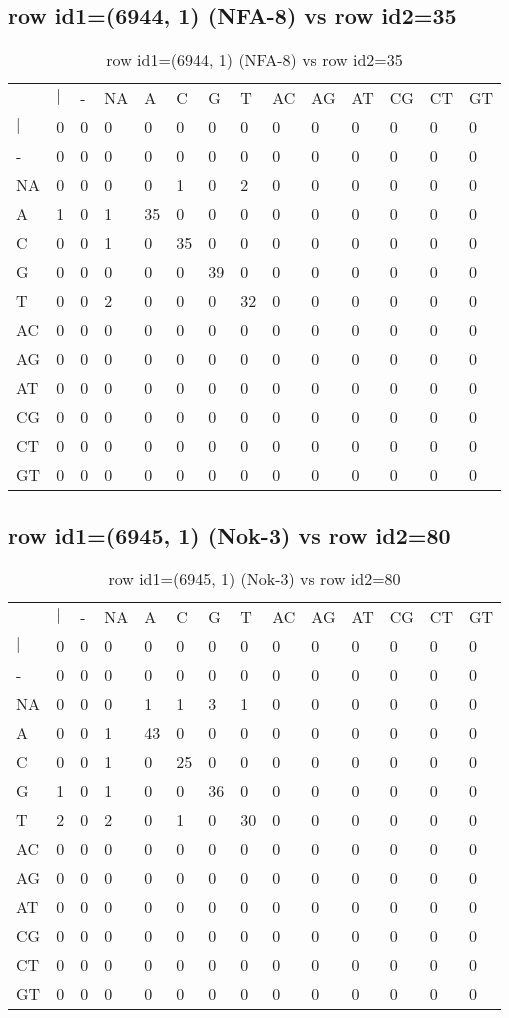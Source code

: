 \subsection{row id1=(6944, 1) (NFA-8) vs row id2=35}
\begin{center}
\begin{longtable}{|l|l|l|l|l|l|l|l|l|l|l|l|l|l|}
\caption{row id1=(6944, 1) (NFA-8) vs row id2=35} \label{table_dm154}\\
\hline
\\
\hline
&$|$&-&NA&A&C&G&T&AC&AG&AT&CG&CT&GT\\
$|$&0&0&0&0&0&0&0&0&0&0&0&0&0\\
-&0&0&0&0&0&0&0&0&0&0&0&0&0\\
NA&0&0&0&0&1&0&2&0&0&0&0&0&0\\
A&1&0&1&35&0&0&0&0&0&0&0&0&0\\
C&0&0&1&0&35&0&0&0&0&0&0&0&0\\
G&0&0&0&0&0&39&0&0&0&0&0&0&0\\
T&0&0&2&0&0&0&32&0&0&0&0&0&0\\
AC&0&0&0&0&0&0&0&0&0&0&0&0&0\\
AG&0&0&0&0&0&0&0&0&0&0&0&0&0\\
AT&0&0&0&0&0&0&0&0&0&0&0&0&0\\
CG&0&0&0&0&0&0&0&0&0&0&0&0&0\\
CT&0&0&0&0&0&0&0&0&0&0&0&0&0\\
GT&0&0&0&0&0&0&0&0&0&0&0&0&0\\
\hline
\end{longtable}
\end{center}

\subsection{row id1=(6945, 1) (Nok-3) vs row id2=80}
\begin{center}
\begin{longtable}{|l|l|l|l|l|l|l|l|l|l|l|l|l|l|}
\caption{row id1=(6945, 1) (Nok-3) vs row id2=80} \label{table_dm156}\\
\hline
\\
\hline
&$|$&-&NA&A&C&G&T&AC&AG&AT&CG&CT&GT\\
$|$&0&0&0&0&0&0&0&0&0&0&0&0&0\\
-&0&0&0&0&0&0&0&0&0&0&0&0&0\\
NA&0&0&0&1&1&3&1&0&0&0&0&0&0\\
A&0&0&1&43&0&0&0&0&0&0&0&0&0\\
C&0&0&1&0&25&0&0&0&0&0&0&0&0\\
G&1&0&1&0&0&36&0&0&0&0&0&0&0\\
T&2&0&2&0&1&0&30&0&0&0&0&0&0\\
AC&0&0&0&0&0&0&0&0&0&0&0&0&0\\
AG&0&0&0&0&0&0&0&0&0&0&0&0&0\\
AT&0&0&0&0&0&0&0&0&0&0&0&0&0\\
CG&0&0&0&0&0&0&0&0&0&0&0&0&0\\
CT&0&0&0&0&0&0&0&0&0&0&0&0&0\\
GT&0&0&0&0&0&0&0&0&0&0&0&0&0\\
\hline
\end{longtable}
\end{center}

